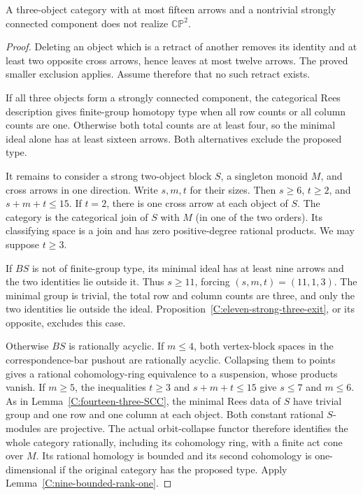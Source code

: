 \begin{proposition}\label{C:fifteen-three-SCC}
A three-object category with at most fifteen arrows and a
nontrivial strongly connected component does not realize
$\mathbb{CP}^2$.
\end{proposition}
\begin{proof}
Deleting an object which is a retract of another removes its
identity and at least two opposite cross arrows, hence leaves
at most twelve arrows.  The proved smaller exclusion applies.
Assume therefore that no such retract exists.

If all three objects form a strongly connected component,
the categorical Rees description gives finite-group homotopy
type when all row counts or all column counts are one.
Otherwise both total counts are at least four, so the minimal
ideal alone has at least sixteen arrows.  Both alternatives
exclude the proposed type.

It remains to consider a strong two-object block $S$, a singleton
monoid $M$, and cross arrows in one direction.  Write $s,m,t$
for their sizes.  Then $s\geq6$, $t\geq2$, and $s+m+t\leq15$.
If $t=2$, there is one cross arrow at each object of $S$.
The category is the categorical join of $S$ with $M$ (in one
of the two orders).  Its classifying space is a join and has
zero positive-degree rational products.
We may suppose $t\geq3$.

If $BS$ is not of finite-group type, its minimal ideal has at
least nine arrows and the two identities lie outside it.
Thus $s\geq11$, forcing $(s,m,t)=(11,1,3)$.
The minimal group is trivial, the total row and column counts
are three, and only the two identities lie outside the ideal.
Proposition~\ref{C:eleven-strong-three-exit}, or its opposite,
excludes this case.

Otherwise $BS$ is rationally acyclic.  If $m\leq4$, both
vertex-block spaces in the correspondence-bar pushout are
rationally acyclic.  Collapsing them to points gives a rational
cohomology-ring equivalence to a suspension, whose products vanish.
If $m\geq5$, the inequalities $t\geq3$ and $s+m+t\leq15$
give $s\leq7$ and $m\leq6$.  As in
Lemma~\ref{C:fourteen-three-SCC}, the minimal Rees data of $S$
have trivial group and one row and one column at each object.
Both constant rational $S$-modules are projective.
The actual orbit-collapse functor therefore identifies the
whole category rationally, including its cohomology ring,
with a finite act cone over $M$.  Its rational homology is
bounded and its second cohomology is one-dimensional if the
original category has the proposed type.  Apply
Lemma~\ref{C:nine-bounded-rank-one}.
\end{proof}

